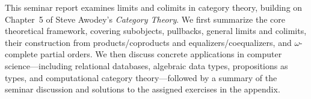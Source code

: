 This seminar report examines limits and colimits in category theory, building on Chapter~5 of Steve Awodey's \emph{Category Theory}. We first summarize the core theoretical framework, covering subobjects, pullbacks, general limits and colimits, their construction from products/coproducts and equalizers/coequalizers, and $\omega$-complete partial orders.
We then discuss concrete applications in computer science—including relational databases, algebraic data types, propositions as types, and computational category theory—followed by a summary of the seminar discussion and solutions to the assigned exercises in the appendix.